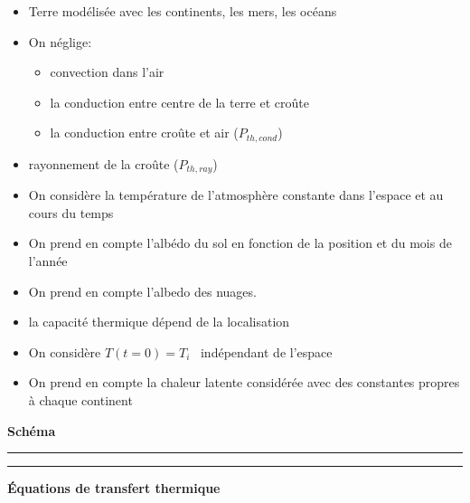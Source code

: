 \documentclass[a4paper,12pt]{article}
\begin{document}
\begin{itemize}
    \item Terre modélisée avec les continents, les mers, les océans 
    \item  On néglige: 
    \begin{itemize}
        \item convection dans l'air
        \item la conduction entre centre de la terre et croûte
        \item la conduction entre croûte et air (\(P_{th,cond}\))
    \end{itemize} 
    \item  rayonnement de la croûte (\(P_{th,ray}\))
    \item On considère la température de l'atmosphère constante dans l'espace et  au cours du temps 
    \item On prend en compte l'albédo du sol en fonction de la position et du mois de l'année 
    \item On prend en compte l'albedo des nuages.
    \item la capacité thermique dépend de la localisation
    \item On considère $T(t=0) = T_i$ \  indépendant de l'espace  
    \item On prend en compte la chaleur latente considérée avec des constantes propres à chaque continent\\
    
    
    
    
\end{itemize}


\textbf{Schéma}
\noindent\textcolor{gray}{\rule{\linewidth}{0.4pt}}

    
\begin{center}
  
\end{center}
\noindent\textcolor{gray}{\rule{\linewidth}{0.4pt}}
\vspace{0.2cm}
\textbf{Équations de transfert thermique}
\end{document}
